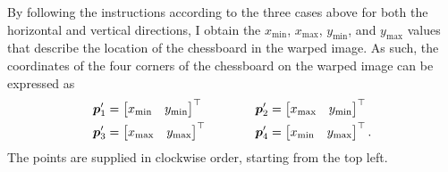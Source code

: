 \documentclass[../report.tex]{subfiles}
\begin{document}
By following the instructions according to the three cases above for both the horizontal and vertical directions, I obtain the
$x_\text{min}$,
$x_\text{max}$,
$y_\text{min}$, and
$y_\text{max}$
values that describe the location of the chessboard in the warped image. 
As such, the coordinates of the four corners of the chessboard on the warped image can be expressed as
\begin{equation*}
    \begin{split}
        {\bm{p}}'_1 &= \begin{bmatrix}
            x_\text{min} & y_\text{min}
        \end{bmatrix}^\top \\
        {\bm{p}}'_3 &= \begin{bmatrix}
            x_\text{max} & y_\text{max}
        \end{bmatrix}^\top
    \end{split}
    \qquad\qquad
    \begin{split}
        {\bm{p}}'_2 &= \begin{bmatrix}
            x_\text{max} & y_\text{min}
        \end{bmatrix}^\top \\
        {\bm{p}}'_4 &= \begin{bmatrix}
            x_\text{min} & y_\text{max}
        \end{bmatrix}^\top.
    \end{split}
\end{equation*}
The points are supplied in clockwise order, starting from the top left.
\end{document}
